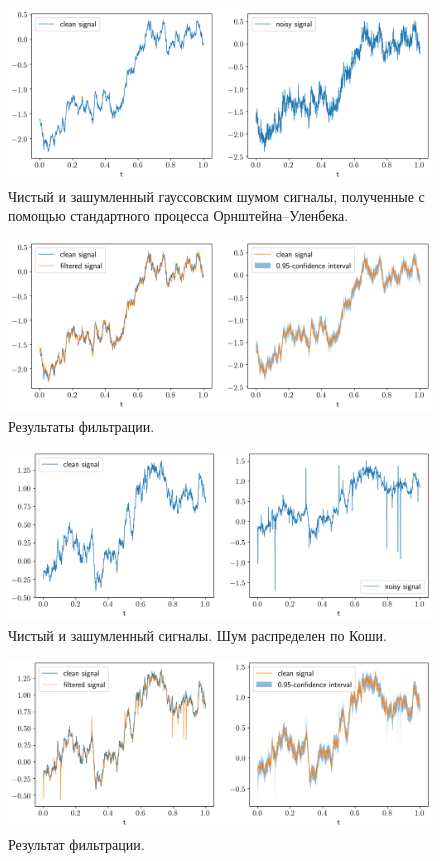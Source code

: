\documentclass[12pt, a4paper]{article} %
\begin{document}
\begin{figure}[H]
    \centering
    \includegraphics[width=\textwidth]{figures/10_noisy.png}
    \caption{Чистый и зашумленный гауссовским шумом сигналы, полученные с помощью стандартного процесса Орнштейна--Уленбека.}
    \label{fig:10_noisy}
\end{figure}
\begin{figure}[H]
    \centering
    \includegraphics[width=\textwidth]{figures/10_filtered.png}
    \caption{Результаты фильтрации.}
    \label{fig:10_filtered}
\end{figure}
\begin{figure}[H]
    \centering
    \includegraphics[width=\textwidth]{figures/10_cnoisy.png}
    \caption{Чистый и зашумленный сигналы. Шум распределен по Коши.}
    \label{fig:10_cnoisy}
\end{figure}
\begin{figure}[H]
    \centering
    \includegraphics[width=\textwidth]{figures/10_cfiltered.png}
    \caption{Результат фильтрации.}
    \label{fig:10_сfiltered}
\end{figure}
\end{document}

